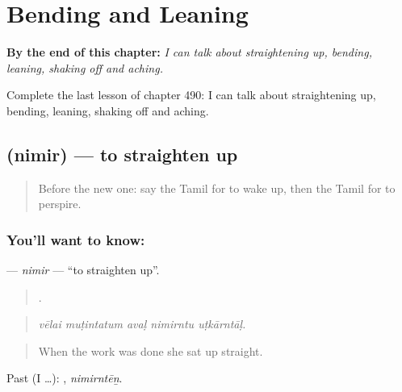 
\chapter{Bending and Leaning}
\label{ch:ta-bending-and-leaning}

\begin{chapteropening}
\textbf{By the end of this chapter:} \emph{I can talk about straightening up, bending, leaning, shaking off and aching.}

Complete the last lesson of chapter 490: I can talk about straightening up, bending, leaning, shaking off and aching.
\end{chapteropening}

\section[\texorpdfstring{\ta{நிமிர்} (nimir)}{நிமிர் (nimir)}]{ (nimir) — to straighten up}

\label{lesson:TA-C490-nimir}



\begin{quote}
Before the new one: say the Tamil for to wake up, then the Tamil for to perspire.
\end{quote}

\subsection*{You'll want to know: }
\textbf{} — \emph{nimir} — \textquotedblleft{}to straighten up\textquotedblright{}.

\begin{quote}
    .
\end{quote}

\begin{quote}
\emph{vēlai muṭintatum avaḷ nimirntu uṭkārntāḷ.}
\end{quote}

\begin{quote}
When the work was done she sat up straight.
\end{quote}

Past (I …): , \emph{nimirntēṉ}.

